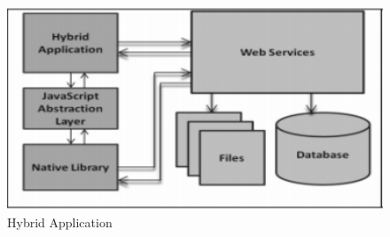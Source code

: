\begin{figure}[h!]
	\caption{Hybrid Application}
	\label{image:myImageName}
	\centering
	\includegraphics[width=1\textwidth]{Images/hybrid_dev_img.PNG}
\end{figure}